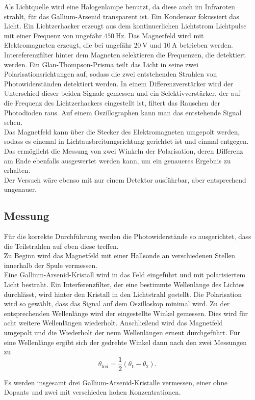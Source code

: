Als Lichtquelle wird eine Halogenlampe benutzt, da diese auch im Infraroten strahlt, für das Gallium-Arsenid transparent ist. Ein Kondensor fokussiert das Licht. Ein Lichtzerhacker erzeugt aus dem kontinuerlichen
Lichtstrom Lichtpulse mit einer Frequenz von ungefähr $\qty{450}{\hertz}$. Das Magnetfeld wird mit Elektromagneten erzeugt, die bei ungefähr $\qty{20}{\volt}$ und $\qty{10}{\ampere}$ betrieben werden. Intereferenzfilter hinter
dem Magneten selektieren die Frequenzen, die detektiert werden. Ein Glan-Thompson-Prisma teilt das Licht in seine zwei Polarisationsrichtungen auf, sodass die zwei entstehenden Strahlen von Photowiderständen detektiert werden.
In einem Differenzverstärker wird der Unterschied dieser beiden Signale gemessen und ein Selektivverstärker, der auf die Frequenz des Lichtzerhackers eingestellt ist, filtert das Rauschen der Photodioden raus. Auf einem Oszillographen
kann man das entstehende Signal sehen. \\

Das Magnetfeld kann über die Stecker des Elektromagneten umgepolt werden, sodass es einemal in Lichtausbreitungsrichtung gerichtet ist und einmal entgegen. Das ermöglicht die Messung von zwei Winkeln der Polarisation,
deren Differenz am Ende ebenfalls ausgewertet werden kann, um ein genaueres Ergebnis zu erhalten. \\

Der Versuch wäre ebenso mit nur einem Detektor ausführbar, aber entsprechend ungenauer.\\

\subsection{Messung}

Für die korrekte Durchführung werden die Photowiderstände so ausgerichtet, dass die Teilstrahlen auf eben diese treffen. \\
Zu Beginn wird das Magnetfeld mit einer Hallsonde an verschiedenen Stellen innerhalb der Spule vermessen. \\

Eine Gallium-Arsenid-Kristall wird in das Feld eingeführt und mit polarisiertem Licht bestraht. Ein Interferenzfilter, der eine bestimmte Wellenlänge des Lichtes durchlässt, wird hinter den Kristall in den Lichtstrahl gestellt.
Die Polarisation wird so gewählt, dass das Signal auf dem Oszilloskop minimal wird. Zu der entsprechenden Wellenlänge wird der eingestellte Winkel gemessen. Dies wird für acht weitere Wellenlängen wiederholt. Anschließend wird das Magnetfeld
umgepolt und die Wiederholt der neun Wellenlängen erneut durchgeführt. Für eine Wellenlänge ergibt sich der gedrehte Winkel dann nach den zwei Messungen zu
\begin{equation}
    \theta_\text{frei} = \frac{1}{2}(\theta_1 - \theta_2).
    \label{eq:theta}
\end{equation}

Es werden insgesamt drei Gallium-Arsenid-Kristalle vermessen, einer ohne Dopants und zwei mit verschieden hohen Konzentrationen. \\

